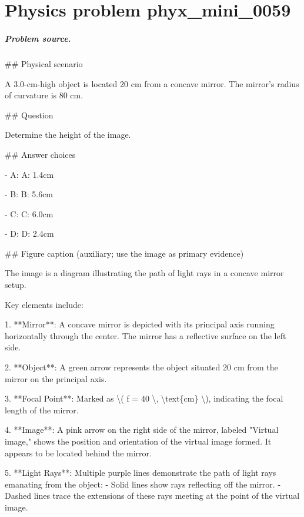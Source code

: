 
\chapter{Physics problem phyx\_mini\_0059}
\label{ch:PhyXMiniProblems_problem_phyx_mini_0059}

\paragraph{Problem source.}
\#\# Physical scenario

A 3.0-cm-high object is located 20 cm from a concave mirror. The mirror’s radius of curvature is 80 cm.

\#\# Question

Determine the height of the image.

\#\# Answer choices

- A: A: 1.4cm

- B: B: 5.6cm

- C: C: 6.0cm

- D: D: 2.4cm

\#\# Figure caption (auxiliary; use the image as primary evidence)

The image is a diagram illustrating the path of light rays in a concave mirror setup. 

Key elements include:

1. **Mirror**: A concave mirror is depicted with its principal axis running horizontally through the center. The mirror has a reflective surface on the left side.

2. **Object**: A green arrow represents the object situated 20 cm from the mirror on the principal axis.

3. **Focal Point**: Marked as \textbackslash{}( f = 40 \textbackslash{}, \textbackslash{}text\{cm\} \textbackslash{}), indicating the focal length of the mirror.

4. **Image**: A pink arrow on the right side of the mirror, labeled "Virtual image," shows the position and orientation of the virtual image formed. It appears to be located behind the mirror.

5. **Light Rays**: Multiple purple lines demonstrate the path of light rays emanating from the object:
   - Solid lines show rays reflecting off the mirror.
   - Dashed lines trace the extensions of these rays meeting at the point of the virtual image.

